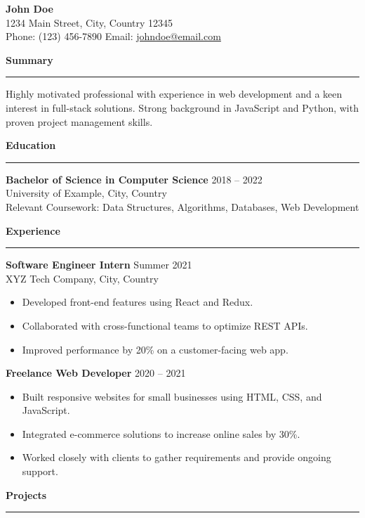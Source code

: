\documentclass[letterpaper,10pt]{article}
\newcommand{\resheading}[1]{
  \vspace{10pt}
  \textbf{\large #1}
  \vspace{5pt}
  \hrule
  \vspace{5pt}
}
\begin{document}
\begin{center}
    {\LARGE \textbf{John Doe}} \\
    1234 Main Street, City, Country 12345 \\
    Phone: (123) 456-7890 \quad\textbullet\quad 
    Email: \href{mailto:johndoe@email.com}{johndoe@email.com}
\end{center}

\resheading{Summary}
Highly motivated professional with experience in web development and a keen interest in full-stack solutions. Strong background in JavaScript and Python, with proven project management skills.

\resheading{Education}
\textbf{Bachelor of Science in Computer Science} \hfill 2018 -- 2022 \\
University of Example, City, Country \\
Relevant Coursework: Data Structures, Algorithms, Databases, Web Development

\resheading{Experience}

\textbf{Software Engineer Intern} \hfill Summer 2021 \\
XYZ Tech Company, City, Country
\begin{itemize}
    \item Developed front-end features using React and Redux.
    \item Collaborated with cross-functional teams to optimize REST APIs.
    \item Improved performance by 20\% on a customer-facing web app.
\end{itemize}

\textbf{Freelance Web Developer} \hfill 2020 -- 2021 \\
\begin{itemize}
    \item Built responsive websites for small businesses using HTML, CSS, and JavaScript.
    \item Integrated e-commerce solutions to increase online sales by 30\%.
    \item Worked closely with clients to gather requirements and provide ongoing support.
\end{itemize}

\resheading{Projects}
\end{document}
